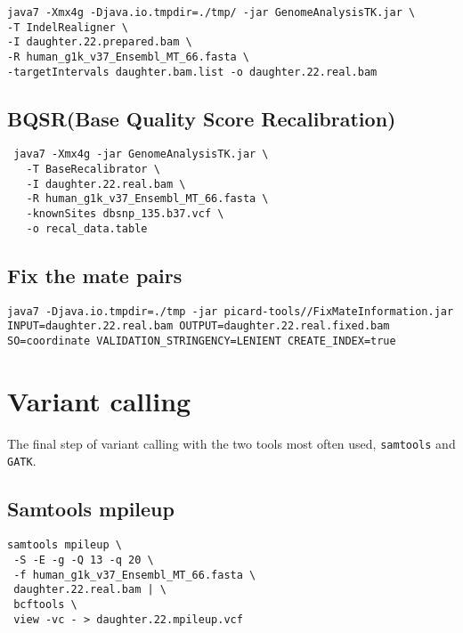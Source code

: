 \documentclass{article}
\begin{document}
\begin{verbatim} 
java7 -Xmx4g -Djava.io.tmpdir=./tmp/ -jar GenomeAnalysisTK.jar \
-T IndelRealigner \
-I daughter.22.prepared.bam \
-R human_g1k_v37_Ensembl_MT_66.fasta \
-targetIntervals daughter.bam.list -o daughter.22.real.bam
\end{verbatim} 


\subsection{BQSR(Base Quality Score Recalibration)}
\begin{verbatim}
 java7 -Xmx4g -jar GenomeAnalysisTK.jar \
   -T BaseRecalibrator \
   -I daughter.22.real.bam \
   -R human_g1k_v37_Ensembl_MT_66.fasta \
   -knownSites dbsnp_135.b37.vcf \
   -o recal_data.table
\end{verbatim}

\subsection{Fix the mate pairs }



\begin{verbatim}
java7 -Djava.io.tmpdir=./tmp -jar picard-tools//FixMateInformation.jar INPUT=daughter.22.real.bam OUTPUT=daughter.22.real.fixed.bam SO=coordinate VALIDATION_STRINGENCY=LENIENT CREATE_INDEX=true 
\end{verbatim}
\section{Variant calling}

The final step of variant calling with the two tools most often used, \verb+samtools+ and \verb+GATK+.

\subsection{Samtools mpileup}
\begin{verbatim}
samtools mpileup \
 -S -E -g -Q 13 -q 20 \
 -f human_g1k_v37_Ensembl_MT_66.fasta \
 daughter.22.real.bam | \
 bcftools \
 view -vc - > daughter.22.mpileup.vcf
\end{verbatim}
\end{document}
